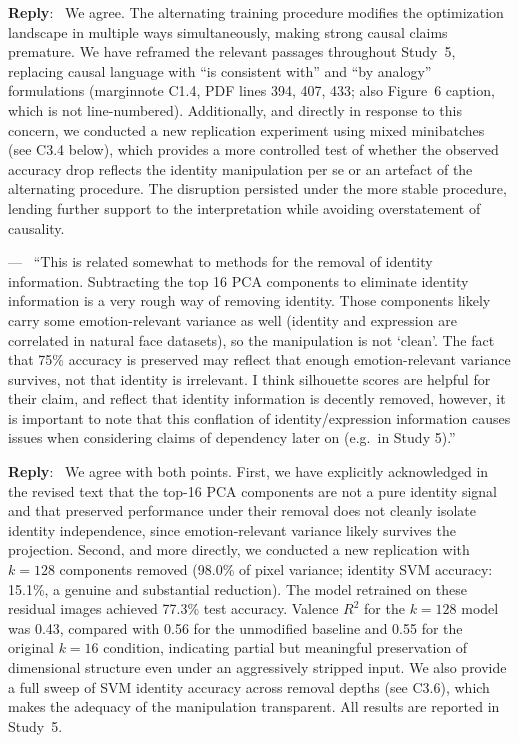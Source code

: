\documentclass[11pt]{article}
\newcounter{reviewer}
\newcounter{point}[reviewer]
\renewcommand{\thepoint}{Comment\,\thereviewer.\arabic{point}}
\newenvironment{point}
   {\refstepcounter{point} \bigskip \noindent {\textbf{\thepoint} } ---\ }
   {\par }
\newenvironment{reply}
   {\medskip \noindent \color{blue} \begin{sf}\textbf{Reply}:\  }
   {\medskip \par \end{sf}}
\begin{document}
\begin{reply}
We agree. The alternating training procedure modifies the optimization landscape in multiple ways simultaneously, making strong causal claims premature. We have reframed the relevant passages throughout Study~5, replacing causal language with ``is consistent with'' and ``by analogy'' formulations (marginnote C1.4, PDF lines 394, 407, 433; also Figure~6 caption, which is not line-numbered). Additionally, and directly in response to this concern, we conducted a new replication experiment using mixed minibatches (see C3.4 below), which provides a more controlled test of whether the observed accuracy drop reflects the identity manipulation per se or an artefact of the alternating procedure. The disruption persisted under the more stable procedure, lending further support to the interpretation while avoiding overstatement of causality.
\end{reply}

\begin{point}
``This is related somewhat to methods for the removal of identity information. Subtracting the top 16 PCA components to eliminate identity information is a very rough way of removing identity. Those components likely carry some emotion-relevant variance as well (identity and expression are correlated in natural face datasets), so the manipulation is not `clean'. The fact that 75\% accuracy is preserved may reflect that enough emotion-relevant variance survives, not that identity is irrelevant. I think silhouette scores are helpful for their claim, and reflect that identity information is decently removed, however, it is important to note that this conflation of identity/expression information causes issues when considering claims of dependency later on (e.g.\ in Study 5).''
\label{comment_1_5}
\end{point}

\begin{reply}
We agree with both points. First, we have explicitly acknowledged in the revised text that the top-16 PCA components are not a pure identity signal and that preserved performance under their removal does not cleanly isolate identity independence, since emotion-relevant variance likely survives the projection. Second, and more directly, we conducted a new replication with $k = 128$ components removed (98.0\% of pixel variance; identity SVM accuracy: 15.1\%, a genuine and substantial reduction). The model retrained on these residual images achieved 77.3\% test accuracy. Valence $R^2$ for the $k = 128$ model was 0.43, compared with 0.56 for the unmodified baseline and 0.55 for the original $k = 16$ condition, indicating partial but meaningful preservation of dimensional structure even under an aggressively stripped input. We also provide a full sweep of SVM identity accuracy across removal depths (see C3.6), which makes the adequacy of the manipulation transparent. All results are reported in Study~5.
\end{reply}
\end{document}
